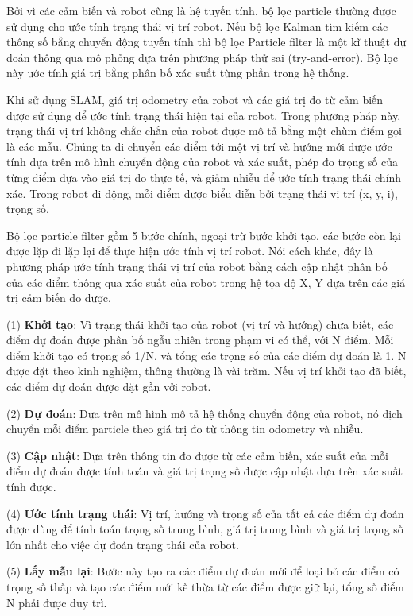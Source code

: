 {Bởi vì các cảm biến và robot cũng là hệ tuyến tính, bộ lọc particle thường được sử dụng cho ước tính trạng thái vị trí robot. Nếu bộ lọc Kalman tìm kiếm các thông số bằng chuyển động tuyến tính thì bộ lọc Particle filter là một kĩ thuật dự đoán thông qua mô phỏng dựa trên phương pháp thử sai (try-and-error). Bộ lọc này ước tính giá trị bằng phân bố xác suất từng phần trong hệ thống.

Khi sử dụng SLAM, giá trị odometry của robot và các giá trị đo từ cảm biến được sử dụng để ước tính trạng thái hiện tại của robot. Trong phương pháp này, trạng thái vị trí không chắc chắn của robot được mô tả bằng một chùm điểm gọi là các mẫu. Chúng ta di chuyển các điểm tới một vị trí và hướng mới được ước tính dựa trên mô hình chuyển động của robot và xác suất, phép đo trọng số của từng điểm dựa vào giá trị đo thực tế, và giảm nhiễu để ước tính trạng thái chính xác. Trong robot di động, mỗi điểm được biểu diễn bởi trạng thái vị trí (x, y, i), trọng số.

Bộ lọc particle filter gồm 5 bước chính, ngoại trừ bước khởi tạo, các bước còn lại được lặp đi lặp lại để thực hiện ước tính vị trí robot. Nói cách khác, đây là phương pháp ước tính trạng thái vị trí của robot bằng cách cập nhật phân bố của các điểm thông qua xác suất của robot trong hệ tọa độ X, Y dựa trên các giá trị cảm biến đo được.

(1) \textbf{Khởi tạo}:
Vì trạng thái khởi tạo của robot (vị trí và hướng) chưa biết, các điểm dự đoán được phân bố ngẫu nhiên trong phạm vi có thể, với N điểm. Mỗi điểm khởi tạo có trọng số 1/N, và tổng các trọng số của các điểm dự đoán là 1. N được đặt theo kinh nghiệm, thông thường là vài trăm. Nếu vị trí khởi tạo đã biết, các điểm dự đoán được đặt gần vởi robot.

(2) \textbf{Dự đoán}: Dựa trên mô hình mô tả hệ thống chuyển động của robot, nó dịch chuyển mỗi điểm particle theo giá trị đo từ thông tin odometry và nhiễu.

(3) \textbf{Cập nhật}: Dựa trên thông tin đo được từ các cảm biến, xác suất của mỗi điểm dự đoán được tính toán và giá trị trọng số được cập nhật dựa trên xác suất tính được.

(4) \textbf{Ước tính trạng thái}: Vị trí, hướng và trọng số của tất cả các điểm dự đoán được dùng để tính toán trọng số trung bình, giá trị trung bình và giá trị trọng số lớn nhất cho việc dự đoán trạng thái của robot.

(5) \textbf{Lấy mẫu lại}: Bước này tạo ra các điểm dự đoán mới để loại bỏ các điểm có trọng số thấp và tạo các điểm mới kế thừa từ các điểm được giữ lại, tổng số điểm N phải được duy trì.

}

